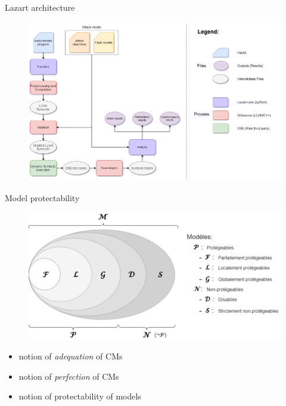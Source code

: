 \section*{}

\miniframesoff

\begin{frame}{Lazart architecture} 
    \begin{figure}
        \includegraphics[width=\textwidth]{img/lazart-arch.png}
    \end{figure}
\end{frame}
    
\begin{frame}{Model protectability} 
    \begin{tiny}
        \begin{figure}
            \includegraphics[scale=0.32]{img/protectable-models-set-extended.drawio.png}
        \end{figure}

        \begin{itemize}
            \item notion of \textit{adequation} of CMs
            \item notion of \textit{perfection} of CMs
            \item notion of protectability of models
        \end{itemize}
        \vfill
    \end{tiny}
\end{frame}

